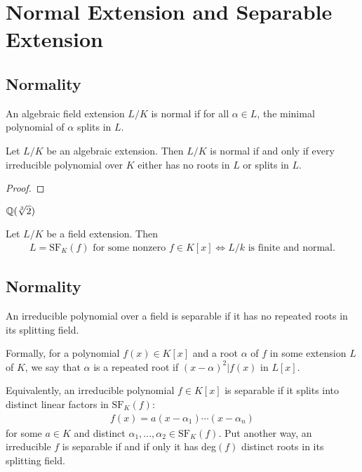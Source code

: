 \chapter{Normal Extension and Separable Extension}\label{chp:6_5}

\section{Normality}

\begin{definition}{}{}
    An algebraic field extension $L/K$ is normal 
    if for all $\alpha\in L$,
    the minimal polynomial of $\alpha$ splits in $L$.
\end{definition}

\begin{lemma}{}{}
    Let $L/K$ be an algebraic extension. 
    Then $L/K$ is normal if and
    only if every irreducible polynomial over $K$ either has no roots in $L$ or splits in $L$.
\end{lemma}
\begin{proof}
    
\end{proof}

\begin{example}{}{}
    $\mathbb{Q}(\sqrt[3]{2})$
\end{example}

\begin{proposition}{}{}
    Let $L/K$ be a field extension. Then
    \begin{align*}
        L= \text{SF}_K ( f ) \text{ for some nonzero $f\in K[x]$}
        \Leftrightarrow L/k \text{ is finite and normal}.
    \end{align*}
\end{proposition}

\section{Normality}

\begin{definition}{}{}
    An irreducible polynomial over a field is separable if it has no
    repeated roots in its splitting field.
\end{definition}
\begin{remark}
    Formally, for a polynomial $f (x) \in K[x]$ 
    and a root $\alpha$ of $f$ in some extension $L$ of $K$, 
    we say that $\alpha$ is a repeated root if $(x - \alpha)^2| f (x)$ in $L[x]$.
\end{remark}
\begin{remark}
    Equivalently, an irreducible polynomial $f \in K[x]$ is separable 
    if it splits into distinct linear factors in $\text{SF}_K (f)$:
    \begin{align*}
        f(x)=a(x-\alpha_1)\cdots (x-\alpha_n)
    \end{align*}
    for some $a\in K$ and distinct $\alpha_1,...,\alpha_2\in \text{SF}_K(f)$.
    Put another way, an irreducible $f$ is separable if and if only it has deg$(f)$ distinct roots in its splitting field. 
\end{remark}

